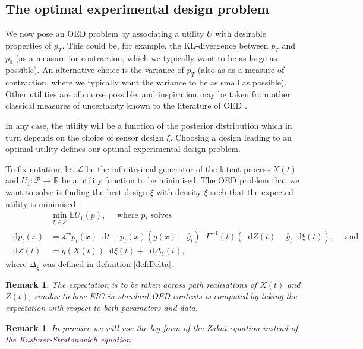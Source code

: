\documentclass[10pt]{article}
\numberwithin{equation}{section}
\numberwithin{figure}{section}
\newtheorem{rem}[thm]{Remark}
\theoremstyle{remark}
\newcommand{\cP}{\mathcal P}
\newcommand{\cL}{\mathcal L}
\newcommand{\dd }{\mathop{}\!\mathrm{d}}
\newcommand{\R}{\mathbb R}
\newcommand{\E}{\mathbb E}
\begin{document}
\subsection{The optimal experimental design problem}\label{sec:setupOED}

We now pose an OED problem by associating a utility $U$ with desirable properties of $p_T$. This could be, for example, the KL-divergence between $p_T$ and $p_0$ (as a measure for contraction, which we typically want to be as large as possible). An alternative choice is the variance of $p_T$ (also as as a measure of contraction, where we typically want the variance to be as small as possible). Other utilities are of course possible, and inspiration may be taken from other classical measures of uncertainty known to the literature of OED \cite{pukelsheim2006optimal}.

In any case, the utility will be a function of the posterior distribution which in turn depends on the choice of sensor design $\xi$. Choosing a design leading to an optimal utility defines our optimal experimental design problem. 

To fix notation, let $\cL$ be the infinitesimal generator of the latent process $X(t)$ and $U_1 :\cP \to \R$ be a utility function to be minimised. The OED problem that we want to solve is finding the best design $\xi$ with density $\xi$ such that the expected utility is minimised:
\begin{align*}
    &\min_{\xi \in \cP} \E U_1(p),\quad \text{ where } p_t \text{ solves }\\
    \dd p_t(x) &= \cL^\star p_t(x)\dd t + p_t(x)\left(g(x) - \bar g_t \right)^\top \Gamma^{-1}(t)\left(\dd Z(t) - \bar g_t\dd \xi(t)\right),\quad \text{ and }\\
     \dd Z(t) &= g(X(t))\dd \xi(t) + \dd\Delta_\xi(t),
\end{align*}
where $\Delta_\xi$ was defined in definition \ref{def:Delta}.

\begin{rem}
    The expectation is to be taken across path realisations of $X(t)$ and $Z(t)$, similar to how EIG in standard OED contexts is computed by taking the expectation with respect to both parameters and data.
\end{rem}
\begin{rem}
    In practice we will use the log-form of the Zakai equation instead of the Kushner-Stratonovich equation.
\end{rem}
\end{document}
